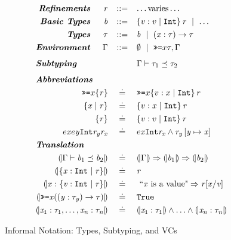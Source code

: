 \begin{figure}[!t]
\centering
\captionsetup{justification=centering}
$$
\begin{array}{rrcl}
\emphbf{Refinements} & \refi     & ::= & \dots \text{varies} \dots \\[0.05in] 
\emphbf{Basic Types} & \base  & ::= & \tref{v}{\tint}{}{\refi} \spmid \dots \\[0.05in] 
\emphbf{Types}       & \typ   & ::= & \base \spmid \tfunref{\x}{\typ}{\typ}{v}{\refi} \\[0.05in] 
\emphbf{Environment} & \env   & ::= & \emptyset \spmid \bind{x}{\typ}, \env \\[0.1in]

\multicolumn{3}{l}{\emphbf{Subtyping}}   & \issubtype{\env}{\typ_1}{\typ_2} \\[0.1in]

\multicolumn{4}{l}{\mbox{\emphbf{Abbreviations}}} \\[0.05in]
  \multicolumn{2}{r}{\bind{x}{\ttref{\refi}}} & \doteq & \bind{x}{\tref{x}{\tint}{}{\refi}} \\[0.05in]
  \multicolumn{2}{r}{\ttreftsimple{\x}{\refi}}   & \doteq & {\tref{x}{\tint}{}{\refi}} \\[0.05in]
  \multicolumn{2}{r}{\ttref{\refi}}             & \doteq & {\tref{v}{\tint}{}{\refi}} \\[0.05in]
  \multicolumn{2}{r}{\reft{\x}{\reft{\y}{\tint}{\refi_\y}}{\refi_\x}} & \doteq & 
  					{\reft{\x}{\tint}{\refi_\x \land \refi_\y\sub{\y}{\x}}} \\[0.05in]


\multicolumn{4}{l}{\mbox{\emphbf{Translation}}} \\[0.05in]
\multicolumn{2}{r}{\embed{\issubtype{\env}{\base_1}{\base_2}}} & \defeq& \isvalidvc{\embed{\env}}{\embed{\base_1}}{\embed{\base_2}}\\[0.05in]
  \multicolumn{2}{r}{\embed{\tttref{\x}{\tint}{}{\refi}}} & \defeq & \lref\\[0.05in]
  \multicolumn{2}{r}{\embed{\ttbind{\x}{\tttref{\vv}{\tint}{}{\refi}}}} &\defeq & \ \mbox{``$\mathtt{\x}$ is a value"}  \Rightarrow \SUBST{\lref}{\vv}{\x}\\[0.05in]
  \multicolumn{2}{r}{\embed{\bind{\x}{(\tfun{\y}{\typ_\y}{\typ})}}} &\defeq & \tttrue\\[0.05in]
  \multicolumn{2}{r}{\embed{\ttbind{\x_1}{\typ_1},\ldots,\ttbind{\x_\n}{\typ_\n}}} & \defeq & \embed{\ttbind{\x_1}{\typ_1}} \wedge \ldots \wedge \embed{\ttbind{\x_\n}{\typ_\n}} \\
\end{array}
$$
\caption[Summary of Informal Notation.]{Informal Notation: Types, Subtyping, and VCs}
\label{fig:overview:syntax}
\end{figure}


